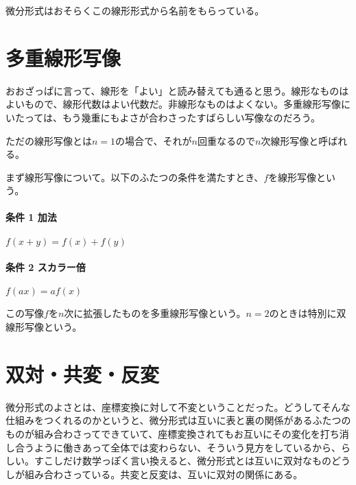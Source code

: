 微分形式はおそらくこの線形形式から名前をもらっている。

\newpage


\section{多重線形写像}

おおざっぱに言って、線形を「よい」と読み替えても通ると思う。線形なものはよいもので、線形代数はよい代数だ。非線形なものはよくない。多重線形写像にいたっては、もう幾重にもよさが合わさったすばらしい写像なのだろう。

ただの線形写像とは$n=1$の場合で、それが$n$回重なるので$n$次線形写像と呼ばれる。

\hrulefill

まず線形写像について。以下のふたつの条件を満たすとき、$ f $を線形写像という。

\paragraph{条件 1 加法}

$ f(x + y) = f(x) + f(y) $

\paragraph{条件 2 スカラー倍}

$ f(ax) = a f(x) $

この写像$f$を$n$次に拡張したものを多重線形写像という。$n=2$のときは特別に双線形写像という。

\newpage


\section{双対・共変・反変}

微分形式のよさとは、座標変換に対して不変ということだった。どうしてそんな仕組みをつくれるのかというと、微分形式は互いに表と裏の関係があるふたつのものが組み合わさってできていて、座標変換されてもお互いにその変化を打ち消し合うように働きあって全体では変わらない、そういう見方をしているから、らしい。すこしだけ数学っぽく言い換えると、微分形式とは互いに双対なものどうしが組み合わさっている。共変と反変は、互いに双対の関係にある。

\newpage


